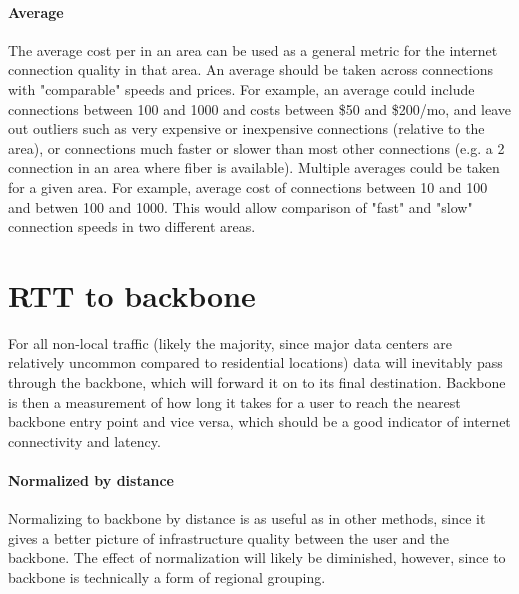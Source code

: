 
\paragraph{Average}
The average cost per \mbps in an area can be used as a general metric for the internet connection quality in that area. An average should be taken across connections with "comparable" speeds and prices. For example, an average could include connections between 100 and 1000 \mbps and costs between \$50 and \$200/mo, and leave out outliers such as very expensive or inexpensive connections (relative to the area), or connections much faster or slower than most other connections (e.g. a 2 \mbps \dsl connection in an area where fiber is available). Multiple averages could be taken for a given area. For example, average cost of connections between 10 and 100 \mbps and betwen 100 and 1000. This would allow comparison of "fast" and "slow" connection speeds in two different areas.


\section{RTT to backbone}

For all non-local traffic (likely the majority, since major data centers are relatively uncommon compared to residential locations) data will inevitably pass through the backbone, which will forward it on to its final destination. Backbone \rtt is then a measurement of how long it takes for a user to reach the nearest backbone entry point and vice versa, which should be a good indicator of internet connectivity and latency.

\paragraph{Normalized by distance}

Normalizing \rtt to backbone by distance is as useful as in other \rtt methods, since it gives a better picture of infrastructure quality between the user and the backbone. The effect of normalization will likely be diminished, however, since \rtt to backbone is technically a form of regional grouping.

